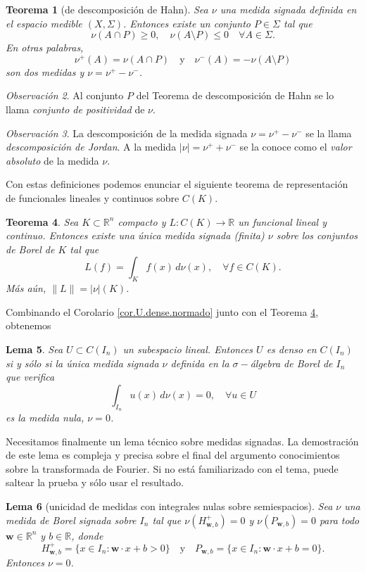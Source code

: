 \documentclass[12pt, a4paper]{amsbook}
\newcommand{\R}{{\mathbb R}}
\newcommand{\ww}{{\mathbf w}}
\newtheorem{teo}{Teorema}[section]
\newtheorem{lema}[teo]{Lema}
\theoremstyle{remark}
\newtheorem{obs}[teo]{Observaci\'on}
\theoremstyle{definition}
\numberwithin{section}{chapter}
\numberwithin{subsection}{section}
\numberwithin{equation}{section}
\numberwithin{figure}{chapter}
\begin{document}
\begin{teo}[de descomposición de Hahn]
Sea $\nu$ una medida signada definida en el espacio medible $(X, \Sigma)$. Entonces existe un conjunto $P\in \Sigma$ tal que
$$
\nu(A\cap P)\ge 0,\quad \nu(A\setminus P)\le 0 \quad \forall A\in \Sigma.
$$
En otras palabras, 
$$
\nu^+(A) =\nu(A\cap P)\quad \text{y}\quad \nu^-(A) = -\nu(A\setminus P)
$$
son dos medidas y $\nu = \nu^+ - \nu^-$.
\end{teo}

\begin{obs}
Al conjunto $P$ del Teorema de descomposición de Hahn se lo llama {\em conjunto de positividad} de $\nu$.
\end{obs}

\begin{obs}
La descomposición de la medida signada $\nu=\nu^+ - \nu^-$ se la llama {\em descomposición de Jordan}. A la medida $|\nu| = \nu^+ + \nu^-$ se la conoce como el {\em valor absoluto} de la medida $\nu$.
\end{obs}


Con estas definiciones podemos enunciar el siguiente teorema de representación de funcionales lineales y continuos sobre $C(K)$.
\begin{teo}\label{teo.representacion}
Sea $K\subset\R^n$ compacto y $L\colon C(K)\to\R$ un funcional lineal y continuo. Entonces existe una única medida signada (finita) $\nu$ sobre los conjuntos de Borel de $K$ tal que
$$
L(f) = \int_K f(x)\, d\nu(x),\quad \forall f\in C(K).
$$
Más aún, $\|L\|=|\nu|(K)$.
\end{teo}

Combinando el Corolario \ref{cor.U.dense.normado} junto con el Teorema \ref{teo.representacion}, obtenemos
\begin{lema}\label{lema.U.denso}
Sea $U\subset C(I_n)$ un subespacio lineal. Entonces $U$ es denso en $C(I_n)$ si y sólo si la única medida signada $\nu$ definida en la $\sigma-$álgebra de Borel de $I_n$ que verifica
$$
\int_{I_n} u(x)\, d\nu(x) = 0,\quad \forall u\in U
$$
es la medida nula, $\nu=0$.
\end{lema}


Necesitamos finalmente un lema técnico sobre medidas signadas. La demostración de este lema es compleja y precisa sobre el final del argumento conocimientos sobre la transformada de Fourier. Si no está familiarizado con el tema, puede saltear la prueba y sólo usar el resultado.
\begin{lema}[unicidad de medidas con integrales nulas sobre semiespacios]\label{lema.choto}
Sea $\nu$ una medida de Borel signada sobre $I_n$ tal que $\nu(H_{\ww,b}^+)=0$ y $\nu(P_{\ww, b})=0$ para todo $\ww\in\R^n$ y $b\in\R$, donde 
$$
H_{\ww,b}^+ = \{x\in I_n\colon \ww\cdot x + b>0\}\quad \text{y}\quad P_{\ww, b} = \{x\in I_n\colon \ww\cdot x + b=0\}.
$$
Entonces $\nu=0$.
\end{lema}
\end{document}
